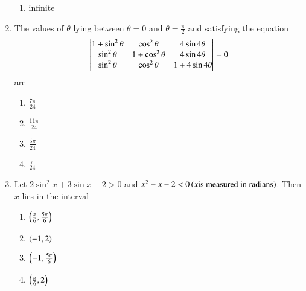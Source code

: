 \documentclass[journal,12pt,twocolumn,article]{IEEEtran}
\theoremstyle{remark}
\begin{document}
\begin{enumerate}
\begin{multicols}{2}
\begin{enumerate}
\item infinite
\end{enumerate}
\end{multicols}
\item The values of $\theta$ lying between $\theta = 0$ and $\theta = \frac{\pi}{2}$ and satisfying the equation
\[\begin{vmatrix}
$$1+\sin^2\theta$$ & $$\cos^2\theta$$ & $$4\sin4\theta$$\\
$$\sin^2\theta$$ & $$1+\cos^2\theta$$ & $$4\sin4\theta$$\\
$$\sin^2\theta$$ & $$\cos^2\theta$$ & $$1+4\sin4\theta$$
\end{vmatrix} = 0\] are
\hfill{}
\begin{multicols}{2}
\begin{enumerate}
\item $\frac{7\pi}{24}$
\item $\frac{11\pi}{24}$
\columnbreak
\item $\frac{5\pi}{24}$
\item $\frac{\pi}{24}$
\end{enumerate}
\end{multicols}
\item Let $2\sin^2x+3\sin x-2>0$ and $x^2-x-2<0 \left(x \text{is measured in radians}\right)$. Then $x$ lies in the interval
\hfill{}
\begin{multicols}{2}
\begin{enumerate}
\item $\left(\frac{\pi}{6},\frac{5\pi}{6}\right)$
\item $\left(-1,2\right)$
\columnbreak
\item $\left(-1,\frac{5\pi}{6}\right)$
\item $\left(\frac{\pi}{6},2\right)$
\end{enumerate}
\end{multicols}
\end{enumerate}
\end{document}
